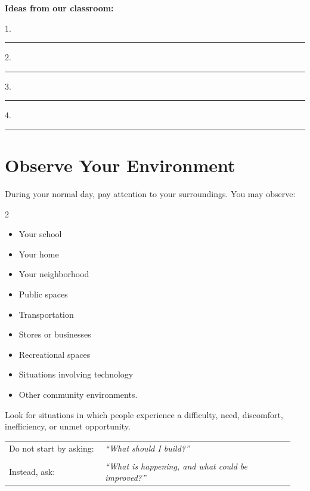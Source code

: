 \documentclass[12pt,a4paper]{article}
\begin{document}
	\vspace{0.3cm}
	
	\textbf{Ideas from our classroom:}
	
	\vspace{0.1cm}
	
	1.\ \rule{0.85\linewidth}{0.4pt}
	
	\vspace{0.25cm}
	
	2.\ \rule{0.85\linewidth}{0.4pt}
	
	\vspace{0.25cm}
	
	3.\ \rule{0.85\linewidth}{0.4pt}
	
	\vspace{0.25cm}
	
	4.\ \rule{0.85\linewidth}{0.4pt}
	
	\vspace{-5mm}
	\section*{Observe Your Environment}
	
	During your normal day, pay attention to your surroundings. You may observe:
	
	\begin{multicols}{2}
		\begin{itemize}[leftmargin=0.6cm,itemsep=0pt]
			\item Your school
			\item Your home
			\item Your neighborhood
			\item Public spaces
			\item Transportation
			\item Stores or businesses
			\item Recreational spaces
			\item Situations involving technology
			\item Other community environments.
		\end{itemize}
	\end{multicols}
	
	Look for situations in which people experience a difficulty, need, discomfort, inefficiency, or unmet opportunity. \vspace{6mm}
	
	\begin{tabular}{@{}p{0.32\linewidth}p{0.63\linewidth}@{}}
		Do not start by asking:
		&
		\textit{``What should I build?''}
		\\[0.15cm]
		&\\
		Instead, ask:
		&
		\textit{``What is happening, and what could be improved?''}
	\end{tabular}
	
\end{document}
